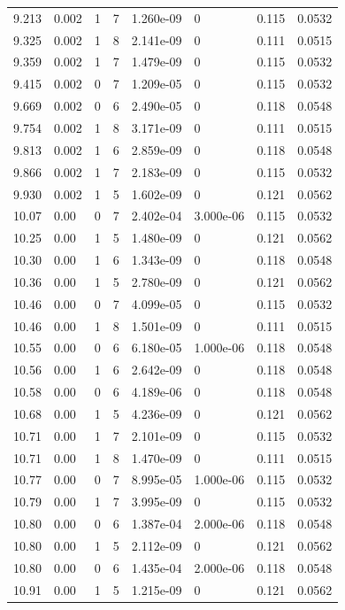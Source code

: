 \documentclass[preview]{standalone}
\begin{document}
{{{\begin{tabular}{L{1.2cm}C{1.2cm} C{0.3cm}C{0.5cm} C{1.4cm}C{1.4cm} C{1.4cm}C{1.4cm}}
  9.213  &  0.002  & 1     &  7 &  1.260e-09  & 0  & 0.115 &  0.0532   \\ 
  9.325  &  0.002  & 1     &  8 &  2.141e-09  & 0  & 0.111 &  0.0515   \\ 
  9.359  &  0.002  & 1     &  7 &  1.479e-09  & 0  & 0.115 &  0.0532   \\ 
  9.415  &  0.002  & 0     &  7 &  1.209e-05  & 0  & 0.115 &  0.0532   \\ 
  9.669  &  0.002  & 0     &  6 &  2.490e-05  & 0  & 0.118 &  0.0548   \\ 
  9.754  &  0.002  & 1     &  8 &  3.171e-09  & 0  & 0.111 &  0.0515   \\ 
  9.813  &  0.002  & 1     &  6 &  2.859e-09  & 0  & 0.118 &  0.0548   \\ 
  9.866  &  0.002  & 1     &  7 &  2.183e-09  & 0  & 0.115 &  0.0532   \\ 
  9.930  &  0.002  & 1     &  5 &  1.602e-09  & 0  & 0.121 &  0.0562   \\ 
  10.07  &  0.00  & 0     &  7 &  2.402e-04  & 3.000e-06  & 0.115 &  0.0532   \\ 
  10.25  &  0.00  & 1     &  5 &  1.480e-09  & 0  & 0.121 &  0.0562   \\ 
  10.30  &  0.00  & 1     &  6 &  1.343e-09  & 0  & 0.118 &  0.0548   \\ 
  10.36  &  0.00  & 1     &  5 &  2.780e-09  & 0  & 0.121 &  0.0562   \\ 
  10.46  &  0.00  & 0     &  7 &  4.099e-05  & 0  & 0.115 &  0.0532   \\ 
  10.46  &  0.00  & 1     &  8 &  1.501e-09  & 0  & 0.111 &  0.0515   \\ 
  10.55  &  0.00  & 0     &  6 &  6.180e-05  & 1.000e-06  & 0.118 &  0.0548   \\ 
  10.56  &  0.00  & 1     &  6 &  2.642e-09  & 0  & 0.118 &  0.0548   \\ 
  10.58  &  0.00  & 0     &  6 &  4.189e-06  & 0  & 0.118 &  0.0548   \\ 
  10.68  &  0.00  & 1     &  5 &  4.236e-09  & 0  & 0.121 &  0.0562   \\ 
  10.71  &  0.00  & 1     &  7 &  2.101e-09  & 0  & 0.115 &  0.0532   \\ 
  10.71  &  0.00  & 1     &  8 &  1.470e-09  & 0  & 0.111 &  0.0515   \\ 
  10.77  &  0.00  & 0     &  7 &  8.995e-05  & 1.000e-06  & 0.115 &  0.0532   \\ 
  10.79  &  0.00  & 1     &  7 &  3.995e-09  & 0  & 0.115 &  0.0532   \\ 
  10.80  &  0.00  & 0     &  6 &  1.387e-04  & 2.000e-06  & 0.118 &  0.0548   \\ 
  10.80  &  0.00  & 1     &  5 &  2.112e-09  & 0  & 0.121 &  0.0562   \\ 
  10.80  &  0.00  & 0     &  6 &  1.435e-04  & 2.000e-06  & 0.118 &  0.0548   \\ 
  10.91  &  0.00  & 1     &  5 &  1.215e-09  & 0  & 0.121 &  0.0562   \\ 
\hline 
\end{tabular} 

}}}
\end{document}
